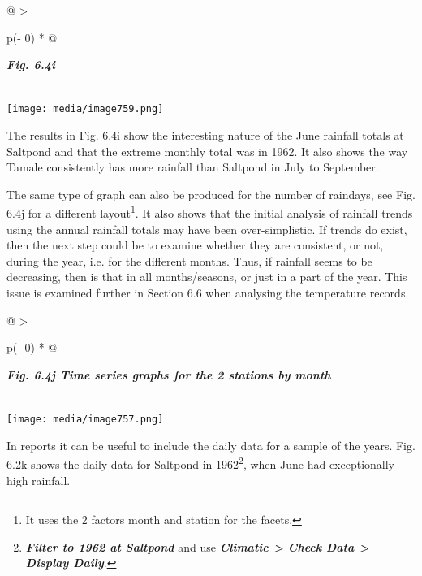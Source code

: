 \documentclass[
  letterpaper,
  DIV=11,
  numbers=noendperiod]{scrreprt}
\begin{document}
\begin{longtable}[]{@{}
  >{\raggedright\arraybackslash}p{(\columnwidth - 0\tabcolsep) * }@{}}
\toprule\noalign{}
\begin{minipage}[b]{\linewidth}\raggedright
\textbf{\emph{Fig. 6.4i}}
\end{minipage} \\
\midrule\noalign{}
\endhead
\bottomrule\noalign{}
\endlastfoot
\texttt{[image: media/image759.png]} \\
\end{longtable}

The results in Fig. 6.4i show the interesting nature of the June
rainfall totals at Saltpond and that the extreme monthly total was in
1962. It also shows the way Tamale consistently has more rainfall than
Saltpond in July to September.

The same type of graph can also be produced for the number of raindays,
see Fig. 6.4j for a different layout\footnote{It uses the 2 factors
  month and station for the facets.}. It also shows that the initial
analysis of rainfall trends using the annual rainfall totals may have
been over-simplistic. If trends do exist, then the next step could be to
examine whether they are consistent, or not, during the year, i.e. for
the different months. Thus, if rainfall seems to be decreasing, then is
that in all months/seasons, or just in a part of the year. This issue is
examined further in Section 6.6 when analysing the temperature records.

\begin{longtable}[]{@{}
  >{\raggedright\arraybackslash}p{(\columnwidth - 0\tabcolsep) * }@{}}
\toprule\noalign{}
\begin{minipage}[b]{\linewidth}\raggedright
\textbf{\emph{Fig. 6.4j Time series graphs for the 2 stations by month}}
\end{minipage} \\
\midrule\noalign{}
\endhead
\bottomrule\noalign{}
\endlastfoot
\texttt{[image: media/image757.png]} \\
\end{longtable}

In reports it can be useful to include the daily data for a sample of
the years. Fig. 6.2k shows the daily data for Saltpond in
1962\footnote{\textbf{\emph{Filter to 1962 at Saltpond}} and use
  \textbf{\emph{Climatic \textgreater{} Check Data \textgreater{}
  Display Daily}}.}, when June had exceptionally high rainfall.
\end{document}
